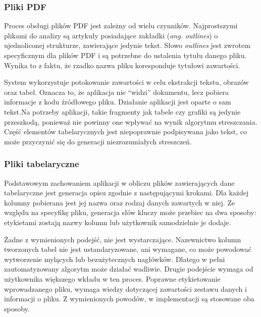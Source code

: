 \documentclass[12pt,a4paper,twoside]{article}
\begin{document}
\subsubsection*{Pliki PDF}
Proces obsługi plików PDF jest zależny od wielu czynników. Najprostszymi plikami do analizy są artykuły posiadające zakładki (\textit{ang. outlines}) o ujednoliconej strukturze, zawierające jedynie tekst. Słowo \textit{outlines} jest zwrotem specyficznym dla plików PDF i są potrzebne do ustalenia tytułu danego pliku. Wynika to z faktu, że rzadko nazwa pliku koresponduje tytułowi zawartości.\par
System wykorzystuje potokowanie zawartości w celu ekstrakcji tekstu, obrazów oraz tabel. Oznacza to, że aplikacja nie ``widzi'' dokumentu, lecz pobiera informacje z kodu źródłowego pliku. Działanie aplikacji jest oparte o sam tekst.\break Na potrzeby aplikacji, takie fragmenty jak tabele czy grafiki są jedynie przeszkodą, ponieważ nie powinny one wpływać na wynik algorytmu streszczania. Część elementów tabelarycznych jest niepoprawnie podpisywana jako tekst, co może przyczynić się do generacji niezrozumiałych streszczeń. 
\subsubsection*{Pliki tabelaryczne}
Podstawowym zachowaniem aplikacji w obliczu plików zawierających dane tabelaryczne jest generacja opisu zgodnie z następującymi krokami. Dla każdej kolumny pobierana jest jej nazwa oraz rodzaj danych zawartych w niej. Ze względu na specyfikę pliku, generacja słów kluczy może przebiec na dwa sposoby: etykietami zostają nazwy kolumn lub użytkownik samodzielnie je dodaje.\par
Żadne z wymienionych podejść, nie jest wystarczające. Nazewnictwo kolumn tworzonych tabel nie jest ustandaryzowane, ani wymagane, co może powodować wytworzenie mylących lub bezużytecznych nagłówków. Dlatego w pełni zautomatyzowany algorytm może działać wadliwie. Drugie podejście wymaga od użytkownika większego wkładu w ten proces. Poprawne etykietowanie wprowadzanego pliku, wymaga wiedzy dotyczącej zawartości zestawu danych i informacji o pliku. Z wymienionych powodów, w implementacji są stosowane oba sposoby.
\end{document}

